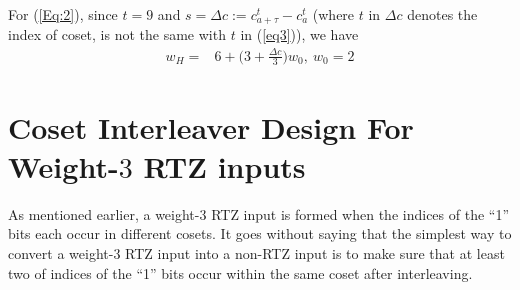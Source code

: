 \documentclass[11pt, oneside, dvipdfmx]{book}
\begin{document}
For (\ref{Eq:2}), since $t = 9$ and $s = \Delta c:=c_{a+\tau}^t-c_{a}^t$ (where $t$ in $\Delta c$ denotes the index of coset, is not the same with $t$ in (\ref{eq3})), we have
\begin{equation}
\begin{split}
w_H=&6+\Big(3+\frac{\Delta c}{3}\Big)w_0,~w_0=2
\end{split}
\end{equation}








\section{Coset Interleaver Design For Weight-$3$ RTZ inputs}
As mentioned earlier, a weight-$3$ RTZ input is formed when the indices of the ``1'' bits each occur in different cosets.  It goes without saying that the simplest way to convert a weight-$3$ RTZ input into a non-RTZ input is to make sure that at least two of indices of the ``1'' bits occur within the same coset after interleaving.
\end{document}
